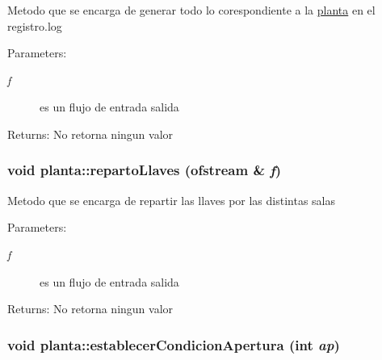 Metodo que se encarga de generar todo lo corespondiente a la \hyperlink{classplanta}{planta} en el registro.log \begin{Desc}
\item[Parameters:]
\begin{description}
\item[{\em f}]es un flujo de entrada salida \end{description}
\end{Desc}
\begin{Desc}
\item[Returns:]No retorna ningun valor \end{Desc}
\hypertarget{classplanta_99d7ef1836db1ae602104e1878f5f430}{
\subsubsection[repartoLlaves]{\setlength{\rightskip}{0pt plus 5cm}void planta::repartoLlaves (ofstream \& {\em f})}}
\label{classplanta_99d7ef1836db1ae602104e1878f5f430}


Metodo que se encarga de repartir las llaves por las distintas salas \begin{Desc}
\item[Parameters:]
\begin{description}
\item[{\em f}]es un flujo de entrada salida \end{description}
\end{Desc}
\begin{Desc}
\item[Returns:]No retorna ningun valor \end{Desc}
\hypertarget{classplanta_5a10e66e70a71d957e1dde4a019b8280}{
\subsubsection[establecerCondicionApertura]{\setlength{\rightskip}{0pt plus 5cm}void planta::establecerCondicionApertura (int {\em ap})}}
\label{classplanta_5a10e66e70a71d957e1dde4a019b8280}


